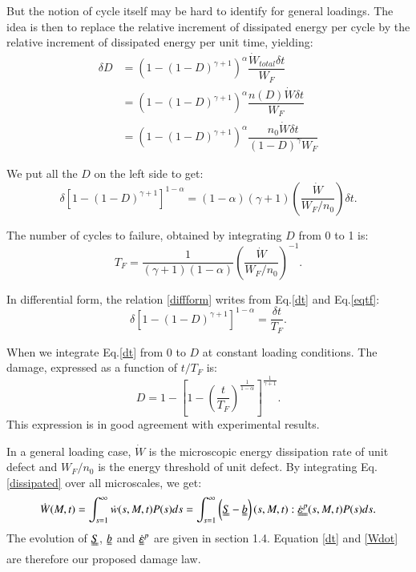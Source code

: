 \documentclass[3p,times,number,review]{elsarticle}
\begin{document}
But the notion of cycle itself may be hard to identify for general loadings. The idea is then to replace the relative increment of dissipated energy per cycle by the relative increment of dissipated energy per unit time, yielding:
\begin{equation}
	\begin{split}
\delta D&= \left( 1 -(1-D)^{\gamma+1}\right)^\alpha \dfrac{\dot{W}_{total}\delta t}{W_F}
          \\&= \left( 1 -(1-D)^{\gamma+1}\right)^\alpha \dfrac{n(D)\dot{W}\delta t}{W_F}
          \\&= \left( 1 -(1-D)^{\gamma+1}\right)^\alpha \dfrac{n_0\dot{W}\delta t}{\left(1-D \right)^\gamma W_F}
	\end{split}
\label{W}
\end{equation}

We put all the $D$ on the left side to get:
\begin{equation}
\delta [1-(1-D)^{\gamma+1}]^{1-\alpha}=(1-\alpha)(\gamma+1)\left( \dfrac{\dot{W}}{W_F/n_0}\right) \delta t.
\label{dt}
\end{equation}

The number of cycles to failure, obtained by integrating $D$ from 0 to 1 is:
\begin{equation}
T_F=\frac{1}{(\gamma+1)(1-\alpha)}\left( \dfrac{\dot{W}}{W_F/n_0}\right) ^{-1}.
\label{eqtf}
\end{equation}

In differential form, the relation \eqref{diffform} writes from Eq.\eqref{dt} and Eq.\eqref{eqtf}:
\begin{equation}\delta [1-(1-D)^{\gamma+1}]^{1-\alpha}=\frac{\delta t}{T_F}.
\label{diffform}
\end{equation}

When we integrate Eq.\eqref{dt} from $0$ to $D$ at constant loading conditions. The damage, expressed as a function of $t/T_F$ is:
\begin{equation}D=1-\left[ 1-\left( \frac{t}{T_F}\right) ^{\frac{1}{1-\alpha}}\right] ^{\frac{1}{\gamma+1}}.
\label{eqD}
\end{equation}
This expression is in good agreement with experimental results\cite{lemaitre1990mechanics}. 

In a general loading case, $\dot{W}$ is the microscopic energy dissipation rate of unit defect and $W_F/n_0$ is the energy threshold of unit defect. By integrating Eq.\eqref{dissipated} over all microscales, we get:
\begin{equation}\dot{W}(M,t)=\int_{s=1}^{\infty}\dot{w}(s,M,t)P(s)ds=\int_{s=1}^{\infty}\left(\uuline{S}-\uuline{b} \right) (s,M,t):\uuline{\dot{\varepsilon}^p}(s,M,t)P(s)ds.\label{Wdot}
\end{equation}
The evolution of $\uuline{S}$, $\uuline{b}$ and $\uuline{\dot{\varepsilon}}^p$ are given in section 1.4. Equation \eqref{dt} and \eqref{Wdot} are therefore our proposed damage law.
\end{document}
